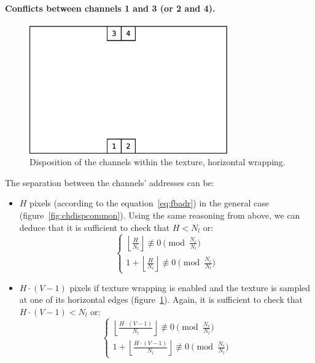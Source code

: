 \documentclass[a4paper,11pt]{kthesis}
\begin{document}
\paragraph{Conflicts between channels 1 and 3 (or 2 and 4).}
\begin{figure}[htp]
\centering
\includegraphics[height=55mm]{chdisp_hwrap.eps}
\caption{Disposition of the channels within the texture, horizontal wrapping.}\label{fig:chdisphwrap}
\end{figure}
The separation between the channels' addresses can be:
\begin{itemize}
\item $H$ pixels (according to the equation~\ref{eq:fbadr}) in the general case (figure~\ref{fig:chdispcommon}). Using the same reasoning from above, we can deduce that it is sufficient to check that $H < N_{l}$ or:
\begin{equation}
\begin{cases}
\left\lfloor \frac{H}{N_{l}} \right\rfloor \not \equiv 0 \pmod{\frac{N_{c}}{N_{l}}} \\
1 + \left\lfloor \frac{H}{N_{l}} \right\rfloor \not \equiv 0 \pmod{\frac{N_{c}}{N_{l}}}
\end{cases}
\end{equation}
\item $H \cdot (V-1)$ pixels if texture wrapping is enabled and the texture is sampled at one of its horizontal edges (figure~\ref{fig:chdisphwrap}). Again, it is sufficient to check that $H \cdot (V-1) < N_{l}$ or:
\begin{equation}
\begin{cases}
\left\lfloor \frac{H \cdot (V-1)}{N_{l}} \right\rfloor \not \equiv 0 \pmod{\frac{N_{c}}{N_{l}}} \\
1 + \left\lfloor \frac{H \cdot (V-1)}{N_{l}} \right\rfloor \not \equiv 0 \pmod{\frac{N_{c}}{N_{l}}}
\end{cases}
\end{equation}
\end{itemize}
\end{document}

